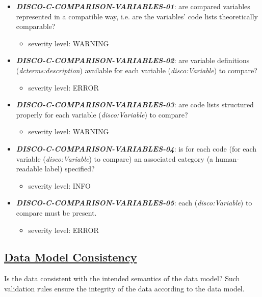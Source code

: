\documentclass{llncs}
\begin{document}
\begin{itemize}
	\item \textbf{{\em DISCO-C-COMPARISON-VARIABLES-01}}: 
	are compared variables represented in a compatible way, i.e. are the variables' code lists theoretically comparable?
		\begin{itemize}
		\item severity level: WARNING
	\end{itemize}
	\item \textbf{{\em DISCO-C-COMPARISON-VARIABLES-02}}: 
	are variable definitions (\emph{dcterms:description}) available for each variable (\emph{disco:Variable}) to compare?
		\begin{itemize}
		\item severity level: ERROR
	\end{itemize}
	\item \textbf{{\em DISCO-C-COMPARISON-VARIABLES-03}}:
	are code lists structured properly for each variable (\emph{disco:Variable}) to compare?
		\begin{itemize}
		\item severity level: WARNING
	\end{itemize}
	\item \textbf{{\em DISCO-C-COMPARISON-VARIABLES-04}}:
	is for each code (for each variable (\emph{disco:Variable}) to compare) an associated category (a human-readable label) specified?
		\begin{itemize}
		\item severity level: INFO
	\end{itemize}
	\item \textbf{{\em DISCO-C-COMPARISON-VARIABLES-05}}:
	each (\emph{disco:Variable}) to compare must be present.
	\begin{itemize}
		\item severity level: ERROR
	\end{itemize}
\end{itemize}

\subsection{\underline{Data Model Consistency}}
Is the data consistent with the intended semantics of the data model?
Such validation rules ensure the integrity of the data according to the data model.
\end{document}
